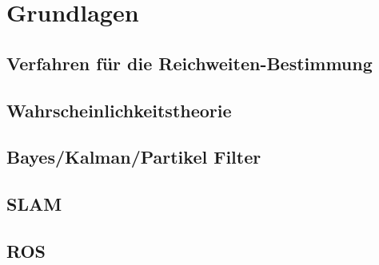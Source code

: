 \chapter{Grundlagen}

\section{Verfahren für die Reichweiten-Bestimmung}

\section{Wahrscheinlichkeitstheorie}

\section{Bayes/Kalman/Partikel Filter}

\section{SLAM}

\section{ROS}